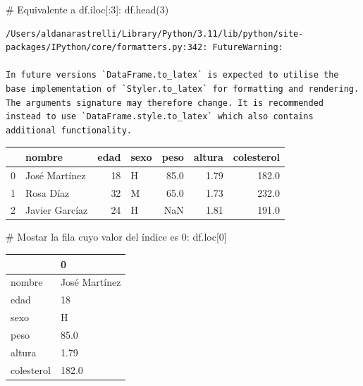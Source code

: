 \documentclass[
  letterpaper,
  DIV=11,
  numbers=noendperiod]{scrreprt}
\newenvironment{Shaded}{\begin{snugshade}}{\end{snugshade}}
\newcommand{\CommentTok}[1]{\textcolor[rgb]{0.37,0.37,0.37}{#1}}
\newcommand{\DecValTok}[1]{\textcolor[rgb]{0.68,0.00,0.00}{#1}}
\newcommand{\NormalTok}[1]{\textcolor[rgb]{0.00,0.23,0.31}{#1}}
\begin{document}
\begin{Shaded}
\begin{Highlighting}[]
\CommentTok{\# Equivalente a df.iloc[:3]:}
\NormalTok{df.head(}\DecValTok{3}\NormalTok{)}
\end{Highlighting}
\end{Shaded}

\begin{verbatim}
/Users/aldanarastrelli/Library/Python/3.11/lib/python/site-packages/IPython/core/formatters.py:342: FutureWarning:

In future versions `DataFrame.to_latex` is expected to utilise the base implementation of `Styler.to_latex` for formatting and rendering. The arguments signature may therefore change. It is recommended instead to use `DataFrame.style.to_latex` which also contains additional functionality.
\end{verbatim}

\begin{tabular}{llrlrrr}
\toprule
{} &          nombre &  edad & sexo &  peso &  altura &  colesterol \\
\midrule
0 &   José Martínez &    18 &    H &  85.0 &    1.79 &       182.0 \\
1 &       Rosa Díaz &    32 &    M &  65.0 &    1.73 &       232.0 \\
2 &  Javier Garcíaz &    24 &    H &   NaN &    1.81 &       191.0 \\
\bottomrule
\end{tabular}

\begin{Shaded}
\begin{Highlighting}[]
\CommentTok{\# Mostar la fila cuyo valor del índice es 0:}
\NormalTok{df.loc[}\DecValTok{0}\NormalTok{]}
\end{Highlighting}
\end{Shaded}

\begin{tabular}{ll}
\toprule
{} &              0 \\
\midrule
nombre     &  José Martínez \\
edad       &             18 \\
sexo       &              H \\
peso       &           85.0 \\
altura     &           1.79 \\
colesterol &          182.0 \\
\bottomrule
\end{tabular}
\end{document}
